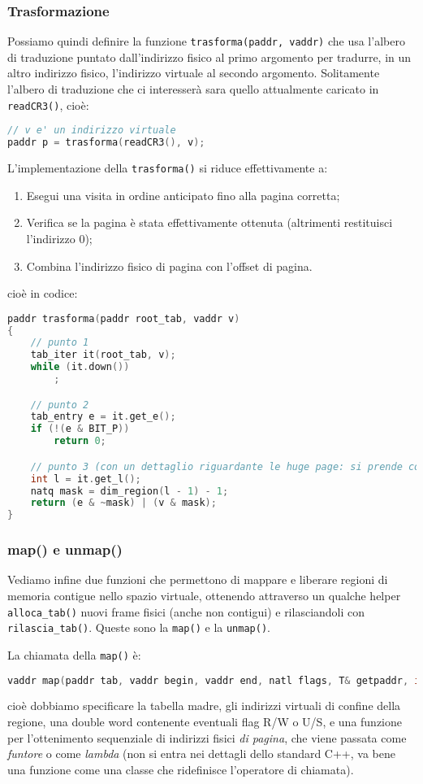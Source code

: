 \documentclass[a4paper,11pt]{article}
\begin{document}
\subsubsection{Trasformazione}
Possiamo quindi definire la funzione \lstinline|trasforma(paddr, vaddr)| che usa l'albero di traduzione puntato dall'indirizzo fisico al primo argomento per tradurre, in un altro indirizzo fisico, l'indirizzo virtuale al secondo argomento.
Solitamente l'albero di traduzione che ci interesserà sara quello attualmente caricato in \lstinline|readCR3()|, cioè:
\begin{lstlisting}[language=C++, style=codestyle]	
// v e' un indirizzo virtuale
paddr p = trasforma(readCR3(), v);
\end{lstlisting}

L'implementazione della \lstinline|trasforma()| si riduce effettivamente a:
\begin{enumerate}
	\item Esegui una visita in ordine anticipato fino alla pagina corretta;
	\item Verifica se la pagina è stata effettivamente ottenuta (altrimenti restituisci l'indirizzo 0);
	\item Combina l'indirizzo fisico di pagina con l'offset di pagina. 
\end{enumerate}
cioè in codice:
\begin{lstlisting}[language=C++, style=codestyle]	
paddr trasforma(paddr root_tab, vaddr v)
{
	// punto 1
	tab_iter it(root_tab, v);
	while (it.down())
		;

	// punto 2
	tab_entry e = it.get_e();
	if (!(e & BIT_P))
		return 0;

	// punto 3 (con un dettaglio riguardante le huge page: si prende come offset la maschera ottenuta da dim_region())
	int l = it.get_l();
	natq mask = dim_region(l - 1) - 1;
	return (e & ~mask) | (v & mask);
}
\end{lstlisting}

\subsubsection{map() e unmap()}
Vediamo infine due funzioni che permettono di mappare e liberare regioni di memoria contigue nello spazio virtuale, ottenendo attraverso un qualche helper \lstinline|alloca_tab()| nuovi frame fisici (anche non contigui) e rilasciandoli con \lstinline|rilascia_tab()|.
Queste sono la \lstinline|map()| e la \lstinline|unmap()|.

La chiamata della \lstinline|map()| è:
\begin{lstlisting}[language=C++, style=codestyle]	
vaddr map(paddr tab, vaddr begin, vaddr end, natl flags, T& getpaddr, int ps_lvl = 1)
\end{lstlisting}
cioè dobbiamo specificare la tabella madre, gli indirizzi virtuali di confine della regione, una double word contenente eventuali flag R/W o U/S, e una funzione per l'ottenimento sequenziale di indirizzi fisici \textit{di pagina}, che viene passata come \textit{funtore} o come \textit{lambda} (non si entra nei dettagli dello standard C++, va bene una funzione come una classe che ridefinisce l'operatore di chiamata).
\end{document}
